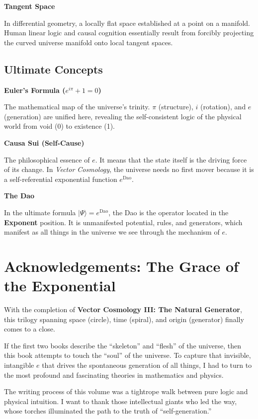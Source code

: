 \documentclass[11pt,a4paper,twoside]{book}
\begin{document}
\textbf{Tangent Space}

In differential geometry, a locally flat space established at a point on a manifold. Human linear logic and causal cognition essentially result from forcibly projecting the curved universe manifold onto local tangent spaces.

\section{Ultimate Concepts}

\textbf{Euler's Formula ($e^{i\pi} + 1 = 0$)}

The mathematical map of the universe's trinity. $\pi$ (structure), $i$ (rotation), and $e$ (generation) are unified here, revealing the self-consistent logic of the physical world from void (0) to existence (1).

\textbf{Causa Sui (Self-Cause)}

The philosophical essence of $e$. It means that the state itself is the driving force of its change. In \textit{Vector Cosmology}, the universe needs no first mover because it is a self-referential exponential function $e^{\text{Dao}}$.

\textbf{The Dao}

In the ultimate formula $|\Psi\rangle = e^{\text{Dao}}$, the Dao is the operator located in the \textbf{Exponent} position. It is unmanifested potential, rules, and generators, which manifest as all things in the universe we see through the mechanism of $e$.

\clearpage{}

\clearpage{}\chapter*{Acknowledgements: The Grace of the Exponential}

With the completion of \textbf{Vector Cosmology III: The Natural Generator}, this trilogy spanning space (circle), time (spiral), and origin (generator) finally comes to a close.

If the first two books describe the ``skeleton'' and ``flesh'' of the universe, then this book attempts to touch the ``soul'' of the universe. To capture that invisible, intangible \textbf{$e$} that drives the spontaneous generation of all things, I had to turn to the most profound and fascinating theories in mathematics and physics.

The writing process of this volume was a tightrope walk between pure logic and physical intuition. I want to thank those intellectual giants who led the way, whose torches illuminated the path to the truth of ``self-generation.''
\end{document}
